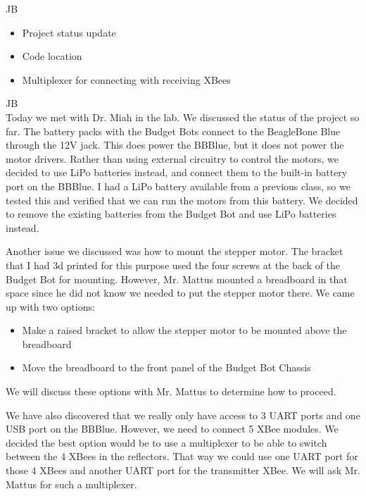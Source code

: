 \documentclass[fontsize=11pt, %
                             paper=letter, %
                             openany, %
                             captions=tableheading,
                             index=totoc,
                             hyperref]{labbook}
\begin{document}
\begin{addmargin}[0cm]{0cm}
JB\\
\begin{itemize}
    \item Project status update
    \item Code location
    \item Multiplexer for connecting with receiving XBees
\end{itemize}

JB\\
Today we met with Dr. Miah in the lab. We discussed the status of the project so far. The battery packs with the Budget Bots connect to the BeagleBone Blue through the 12V jack. This does power the BBBlue, but it does not power the motor drivers. Rather than using external circuitry to control the motors, we decided to use LiPo batteries instead, and connect them to the built-in battery port on the BBBlue. I had a LiPo battery available from a previous class, so we tested this and verified that we can run the motors from this battery. We decided to remove the existing batteries from the Budget Bot and use LiPo batteries instead.\vspace{12pt}

Another issue we discussed was how to mount the stepper motor. The bracket that I had 3d printed for this purpose used the four screws at the back of the Budget Bot for mounting. However, Mr. Mattus mounted a breadboard in that space since he did not know we needed to put the stepper motor there. We came up with two options:
\begin{itemize}
    \item Make a raised bracket to allow the stepper motor to be mounted above the breadboard
    \item Move the breadboard to the front panel of the Budget Bot Chassis
\end{itemize}
We will discuss these options with Mr. Mattus to determine how to proceed.\vspace{12pt}

We have also discovered that we really only have access to 3 UART ports and one USB port on the BBBlue. However, we need to connect 5 XBee modules. We decided the best option would be to use a multiplexer to be able to switch between the 4 XBees in the reflectors. That way we could use one UART port for those 4 XBees and another UART port for the transmitter XBee. We will ask Mr. Mattus for such a multiplexer.\vspace{12pt}


\end{addmargin}
\end{document}
